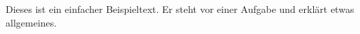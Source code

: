 \documentclass[a4paper]{scrartcl}
\begin{document}
    Dieses ist ein einfacher Beispieltext. Er steht vor einer Aufgabe und erklärt etwas allgemeines.
\end{document}
